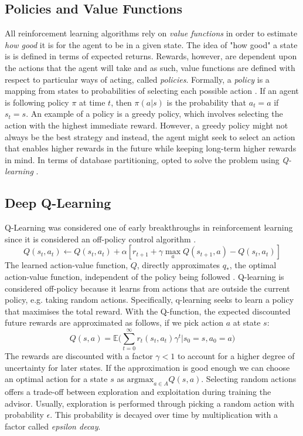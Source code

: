 \subsection{Policies and Value Functions}
All reinforcement learning algorithms rely on \textit{value functions} in order to estimate \textit{how good} it is for the agent to be in a given state. The idea of "how good" a state is is defined in terms of expected returns. Rewards, however, are dependent upon the actions that the agent will take and as such, value functions are defined with respect to particular ways of acting, called \textit{policies}. 
Formally, a \textit{policy} is a mapping from states to probabilities of selecting each possible action \cite{sutton2018reinforcement}. If an agent is following policy $\pi$ at time $t$, then $\pi(a|s)$ is the probability that $a_t=a$ if $s_t=s$. An example of a policy is a greedy policy, which involves selecting the action with the highest immediate reward. However, a greedy policy might not always be the best strategy and instead, the agent might seek to select an action that enables higher rewards in the future while keeping long-term higher rewards in mind. 
In terms of database partitioning, \citeauthor{Hilprecht:2019:TLP:3329859.3329876} opted to solve the problem using \textit{Q-learning} \cite{Hilprecht:2019:TLP:3329859.3329876}.   

\subsection{Deep Q-Learning}
\label{sec:q-learning}
Q-Learning was considered one of early breakthroughs in reinforcement learning since it is considered an off-policy control algorithm \cite{watkins1992q}.
\begin{equation}
\label{eq:bellman}
Q(s_t,a_t) \xleftarrow[]{} Q(s_t,a_t) + \alpha[r_{t+1} + \gamma \max_a Q(s_{t+1},a) - Q(s_t,a_t)]
\end{equation}
The learned action-value function, $Q$, directly approximates $q_*$, the optimal action-value function, independent of the policy being followed \cite{sutton2018reinforcement}. Q-learning is considered off-policy because it learns from actions that are outside the current policy, e.g. taking random actions. Specifically, q-learning seeks to learn a policy that maximises the total reward. 
With the Q-function, the expected discounted future rewards are approximated as follows, if we pick action $a$ at state $s$:
\begin{equation}
    Q(s,a) = \mathbb{E}\bigg(\sum^{\infty}_{t=0}r_t(s_t,a_t)\gamma^t|s_0=s,a_0=a \bigg)
\end{equation}
The rewards are discounted with a factor $\gamma < 1$ to account for a higher degree of uncertainty for later states. If the approximation is good enough we can choose an optimal action for a state $s$ as $\text{argmax}_{a \in A} Q(s,a)$. Selecting random actions offers a trade-off between exploration and exploitation during training the advisor. Usually, exploration is performed through picking a random action with probability $\epsilon$. This probability is decayed over time \cite{sutton2018reinforcement} by multiplication with a factor called \textit{epsilon decay}. 


